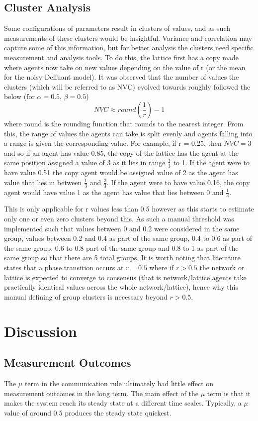 \documentclass{article}
\begin{document}
 \subsection{Cluster Analysis}
 Some configurations of parameters result in clusters of values, and as such measurements of these clusters would be insightful. Variance and correlation may capture some of this information, but for better analysis the clusters need specific measurement and analysis tools. To do this, the lattice first has a copy made where agents now take on new values depending on the value of r (or the mean for the noisy Deffuant model). It was observed that the number of values the clusters (which will be referred to as NVC) evolved towards roughly followed the below (for $\alpha = 0.5$, $\beta = 0.5$)
 \[NVC \approx round(\frac{1}{r})-1\]
 where round is the rounding function that rounds to the nearest integer. From this, the range of values the agents can take is split evenly and agents falling into a range is given the corresponding value. For example, if r = 0.25, then $NVC = 3$ and so if an agent has value 0.85, the copy of the lattice has the agent at the same position assigned a value of 3 as it lies in range $\frac{2}{3}$ to 1. If the agent were to have value 0.51 the copy agent would be assigned value of 2 as the agent has value that lies in between $\frac{1}{3}$ and $\frac{2}{3}$. If the agent were to have value 0.16, the copy agent would have value 1 as the agent has value that lies between 0 and $\frac{1}{3}$.

 This is only applicable for r values less than 0.5 however as this starts to estimate only one or even zero clusters beyond this. As such a manual threshold was implemented such that values between 0 and 0.2 were considered in the same group, values between 0.2 and 0.4 as part of the same group, 0.4 to 0.6 as part of the same group, 0.6 to 0.8 part of the same group and 0.8 to 1 as part of the same group so that there are 5 total groups. It is worth noting that literature states that a phase transition occurs at $r=0.5$ where if $r > 0.5$ the network or lattice is expected to converge to consensus (that is network/lattice agents take practically identical values across the whole network/lattice), hence why this manual defining of group clusters is necessary beyond $r>0.5$.

 \section{Discussion}
 \subsection{Measurement Outcomes}
The $\mu$ term in the communication rule ultimately had little effect on measurement outcomes in the long term. The main effect of the $\mu$ term is that it makes the system reach its steady state at a different time scales. Typically, a $\mu$ value of around 0.5 produces the steady state quickest.
\end{document}
